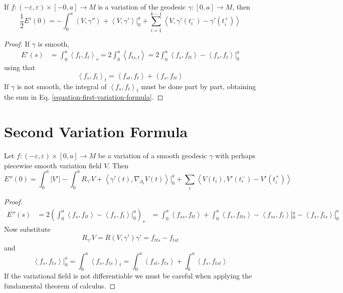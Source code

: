 \begin{theorem}
\label{theorem-first-variation-formula}
If  $f:(-\varepsilon,\varepsilon)\times[-0,a] \to M$ is a variation of
the geodesic $\gamma:[0,a]\to M$, then
\begin{equation}
\label{equation-first-variation-formula}
\frac{1}{2}E'(0)=-\int_0^a\left<V,\gamma''\right>+\left<V,\gamma'\right>|_{0}^a
+\sum_{i=1}^{k-1}\left<V,\gamma'(t_{i}^-)-\gamma'(t_i^+)\right>
\end{equation}
\end{theorem}

\begin{proof}
If $\gamma$ is smooth,
\begin{align*}
E'(s)&=\int_0^a\left<f_t,f_t\right>_s=2\int_0^a\left<f_{ts,t}\right>
=2\int_0^a\left<f_s,f_{tt}\right>-\left<f_s,f_t\right>|_{0}^a
\end{align*}
using that
$$
\left<f_s,f_t\right>_t=\left<f_{st},f_t\right>+\left<f_s,f_{tt}\right>
$$
If $\gamma$ is not smooth, the integral of $\left<f_s,f_t\right>_t$ must be
done part by part, obtaining the sum in Eq.
\ref{equation-first-variation-formula}.
\end{proof}

\section{Second Variation Formula}
\label{section-second-variation}

\begin{theorem}
\label{theorem-second-variation-formula}
Let $f:(-\varepsilon,\varepsilon)\times[0,a] \to M$ be a variation of a smooth
geodesic $\gamma$ with perhaps piecewise smooth variation field $V$. Then
\begin{equation}
\label{equation-second-variation-formula}
E''(0)=\int_0^a |V'|-\int_0^a R_{\gamma'}V+
\left<\gamma'(t),\nabla_{\partial_s}V(t)\right>|_{0}^a+
\sum_{i}\left<V(t_i),V'(t^-_i)-V'(t^+_i)\right>
\end{equation}
\end{theorem}

\begin{proof}
\begin{align*}
E''(s)&
=2\left(\int_0^a\left<f_s,f_{tt}\right>-\left<f_s,f_t\right>|_{0}^a\right)_s
&=\int_0^a\left<f_{ss},f_{tt}\right>+\int_0^a\left<f_s,f_{t ts}\right>
-\left<f_{ss},f_t\right>|_{0}^a-\left<f_s,f_{ts}\right>|_{0}^a
\end{align*}
Now substitute
$$
R_{\gamma'}V=R(V,\gamma')\gamma'=f_{t ts}-f_{tst}
$$
and
$$
\left<f_s,f_{ ts}\right>|_{0}^a=\int_0^a\left<f_s,f_{ ts}\right>_t
=\int_0^a\left<f_{st},f_{ts}\right>+\int_0^a\left<f_s,f_{tst}\right>
$$
If the variational field is not differentiable we must be careful when applying
the fundamental theorem of calculus.
\end{proof}

